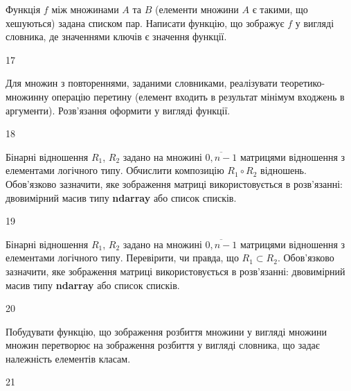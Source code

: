 Функція $f$ між множинами $A$ та $B$ (елементи множини $A$ є такими, що хешуються) задана списком пар. Написати функцію, що зображує $f$ у вигляді словника, де значеннями ключів є значення функції.
\\\par
17 














Для множин з повтореннями, заданими словниками, реалізувати теоретико-множинну операцію перетину (елемент входить в результат мінімум входжень в аргументи). Розв’язання оформити у вигляді функції.
\\\par
18 














Бінарні відношення $R_1$, $R_2$ задано на множині $\overline{0,n-1}$ матрицями відношення з елементами логічного типу. Обчислити композицію $R_1\circ R_2$ відношень. Обов'язково зазначити, яке зображення матриці використовується в розв'язанні: двовимірний масив типу \textbf{ndarray} або список списків.
\\\par
19 














Бінарні відношення $R_1$, $R_2$ задано на множині $\overline{0,n-1}$ матрицями відношення з елементами логічного типу. Перевірити, чи правда, що $R_1\subset R_2$. Обов'язково зазначити, яке зображення матриці використовується в розв'язанні: двовимірний масив типу \textbf{ndarray} або список списків.
\\\par
20 














Побудувати функцію, що зображення розбиття множини у вигляді множини множин перетворює на зображення розбиття у вигляді словника, що задає належність елементів класам.
\\\par
21 














